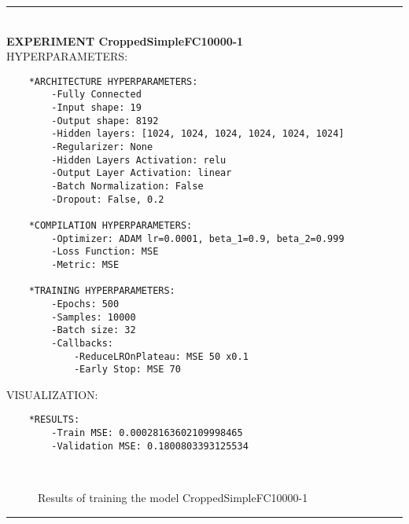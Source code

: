 \rule{0.5\textwidth}{0.5pt}\\

	{\large \textbf{EXPERIMENT CroppedSimpleFC10000-1}}\\
	
	{\normalsize HYPERPARAMETERS:}
	\begin{lstlisting}	
	*ARCHITECTURE HYPERPARAMETERS:
		-Fully Connected
		-Input shape: 19
		-Output shape: 8192
		-Hidden layers: [1024, 1024, 1024, 1024, 1024, 1024]
		-Regularizer: None
		-Hidden Layers Activation: relu
		-Output Layer Activation: linear
		-Batch Normalization: False
		-Dropout: False, 0.2
	
	*COMPILATION HYPERPARAMETERS:
		-Optimizer: ADAM lr=0.0001, beta_1=0.9, beta_2=0.999
		-Loss Function: MSE
		-Metric: MSE
	
	*TRAINING HYPERPARAMETERS:
		-Epochs: 500
		-Samples: 10000
		-Batch size: 32
		-Callbacks: 
			-ReduceLROnPlateau: MSE 50 x0.1
			-Early Stop: MSE 70
	\end{lstlisting}
	
	{\normalsize VISUALIZATION:}
	\begin{lstlisting}
	*RESULTS:
        -Train MSE: 0.00028163602109998465
        -Validation MSE: 0.1800803393125534
	\end{lstlisting}
	
	\begin{figure*}[ht!]
		\hspace{\fill}
		\hspace{\fill}
		\\
		\caption{Results of training the model CroppedSimpleFC10000-1}
	\end{figure*}
	
\FloatBarrier	
\rule{0.5\textwidth}{0.5pt}\\